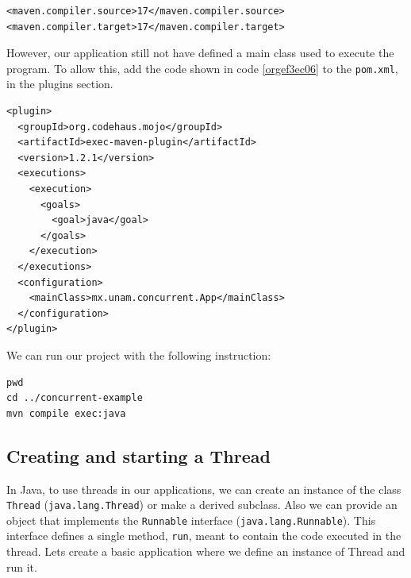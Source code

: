 \documentclass{latex/classes/thesis}
\begin{document}
\begin{lstlisting}
<maven.compiler.source>17</maven.compiler.source>
<maven.compiler.target>17</maven.compiler.target>
\end{lstlisting}

However, our application still not have defined a main class used to execute
the program. To allow this, add the code shown in code \ref{orgef3ec06} to the \texttt{pom.xml},
in the plugins section.

\begin{lstlisting}
<plugin>
  <groupId>org.codehaus.mojo</groupId>
  <artifactId>exec-maven-plugin</artifactId>
  <version>1.2.1</version>
  <executions>
    <execution>
      <goals>
        <goal>java</goal>
      </goals>
    </execution>
  </executions>
  <configuration>
    <mainClass>mx.unam.concurrent.App</mainClass>
  </configuration>
</plugin>
\end{lstlisting}

We can run our project with the following instruction:

\begin{lstlisting}
pwd
cd ../concurrent-example
mvn compile exec:java
\end{lstlisting}


\subsection{Creating and starting a Thread}
\label{sec:orgb6e78bc}

In Java, to use threads in our applications, we can create an instance of the
class \texttt{Thread} (\texttt{java.lang.Thread}) or make a derived subclass. Also we can
provide an object that implements the \texttt{Runnable} interface
(\texttt{java.lang.Runnable}). This interface defines a single method, \texttt{run}, meant to
contain the code executed in the thread. Lets create a basic application
where we define an instance of Thread and run it.
\end{document}
